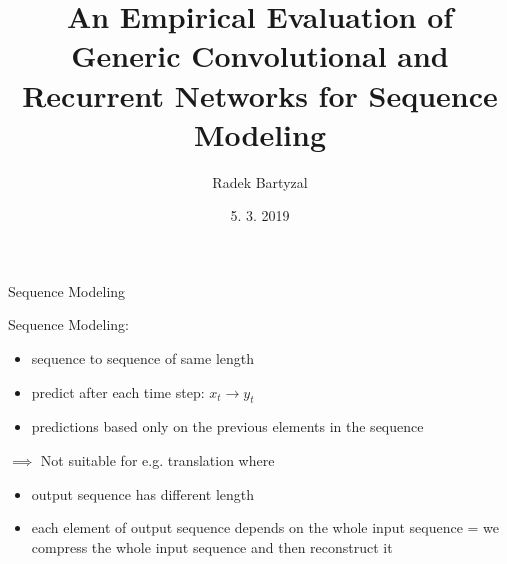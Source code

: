 \documentclass{beamer}
\begin{document}
\title{An Empirical Evaluation of Generic Convolutional and Recurrent Networks for Sequence Modeling}  
\author{Radek Bartyzal}
\date{5. 3. 2019} 

\frame{\titlepage} 

\begin{frame}{Sequence Modeling}

Sequence Modeling:
\begin{itemize}
\item  sequence to sequence of same length
\item predict after each time step: $x_t \rightarrow y_t$
\item predictions based only on the previous elements in the sequence
\end{itemize}

\vfill

$\implies$ Not suitable for e.g. translation where 
\begin{itemize}
\item output sequence has different length
\item each element of output sequence depends on the whole input sequence = we compress the whole input sequence and then reconstruct it 
\end{itemize}


\end{frame}
\end{document}
